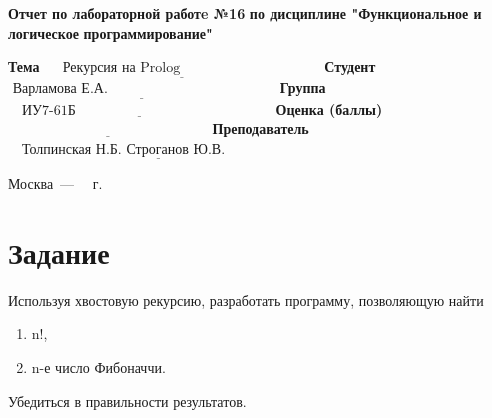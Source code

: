 \documentclass[14pt]{report}
\begin{document}
\begin{titlepage}
	
	\begin{center}
		\noindent\begin{minipage}{1.3\textwidth}\centering
			\Large\textbf{  Отчет по лабораторной работe №16}\newline
			\textbf{по дисциплине "Функциональное и логическое}\newline
			\textbf{программирование"}\newline\newline
		\end{minipage}
	\end{center}
	
	\noindent\textbf{Тема} $\underline{\text{~~~~Рекурсия на Prolog~~~~~~~~~~~~~~~~~~~~~~~~~~~~~~}}$\newline\newline
	\noindent\textbf{Студент} $\underline{\text{~Варламова Е.А.~~~~~~~~~~~~~~~~~~~~~~~~~~~~~~~~~~~~}}$\newline\newline
	\noindent\textbf{Группа} $\underline{\text{~~~ИУ7-61Б~~~~~~~~~~~~~~~~~~~~~~~~~~~~~~~~~~~~~~~~~~}}$\newline\newline
	\noindent\textbf{Оценка (баллы)} $\underline{\text{~~~~~~~~~~~~~~~~~~~~~~~~~~~~~~~~~~~~~~~~~~~}}$\newline\newline
	\noindent\textbf{Преподаватель} $\underline{\text{~~~Толпинская Н.Б. Строганов Ю.В.~~~~~~~~~~~~~~~~~~}}$\newline\newline\newline
	
	\begin{center}
		\vfill
		Москва~---~\the\year
		~г.
	\end{center}
\end{titlepage}

\newpage

\section*{Задание}

Используя хвостовую рекурсию, разработать программу, позволяющую найти
\begin{enumerate}
    \item n!,
    \item n-е число Фибоначчи.
\end{enumerate}

Убедиться в правильности результатов.
\end{document}
